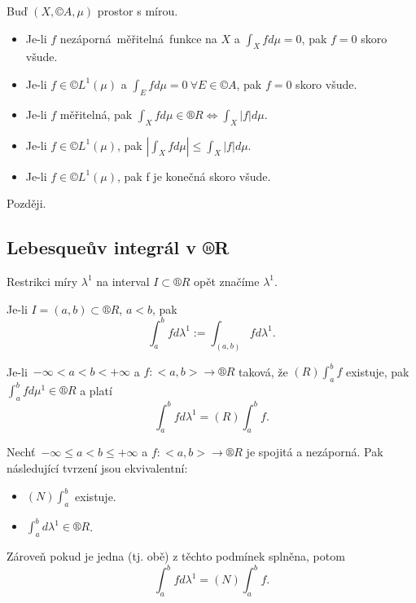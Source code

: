 \documentclass[12pt]{article}					%
\begin{document}
\begin{veta}
	Buď $(X, ©A, \mu)$ prostor s mírou.

	\begin{itemize}
		\item Je-li $f$ nezáporná měřitelná funkce na $X$ a $\int_X f d\mu = 0$, pak $f = 0$ skoro všude.
		\item Je-li $f \in ©L^1(\mu)$ a $\int_E f d\mu = 0\ \forall E \in ©A$, pak $f = 0$ skoro všude.
		\item Je-li $f$ měřitelná, pak $\int_X f d\mu \in ®R \Leftrightarrow \int_X |f| d\mu$.
		\item Je-li $f \in ©L^1(\mu)$, pak $|\int_X f d\mu| ≤ \int_X |f| d\mu$.
		\item Je-li $f \in ©L^1(\mu)$, pak f je konečná skoro všude.
	\end{itemize}

	\begin{dukazin}
		Později.
	\end{dukazin}
\end{veta}

	\subsection{Lebesqueův integrál v ®R}
	\begin{poznamka}[Značení]
		Restrikci míry $\lambda^1$ na interval $I \subset ®R$ opět značíme $\lambda^1$.

		Je-li $I = (a, b) \subset ®R$, $a < b$, pak
		$$ \int_a^b f d\lambda^1 := \int_{(a, b)} f d\lambda^1. $$
	\end{poznamka}

	\begin{veta}
		Je-li $-∞ < a < b < +∞$ a $f:<a, b> \rightarrow ®R$ taková, že $(R) \int_a^b f$ existuje, pak $\int_a^b f d\mu^1 \in ®R$ a platí
		$$ \int_a^b f d\lambda^1 = (R) \int_a^b f. $$
	\end{veta}

	\begin{veta}
		Nechť $-∞ ≤ a < b ≤ +∞$ a $f:<a, b> \rightarrow ®R$ je spojitá a nezáporná. Pak následující tvrzení jsou ekvivalentní:
		
		\begin{itemize}
			\item $(N) \int_a^b$ existuje.
			\item $\int_a^b d\lambda^1 \in ®R$.
		\end{itemize}

		Zároveň pokud je jedna (tj. obě) z těchto podmínek splněna, potom
		$$ \int_a^b f d\lambda^1 = (N) \int_a^b f. $$
	\end{veta}
\end{document}
